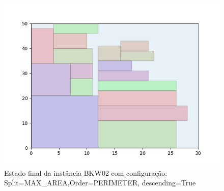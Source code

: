\begin{figure}[H]
    \centering
    \caption[]{Estado final da instância BKW02 com configuração: Split=MAX_AREA,Order=PERIMETER, descending=True}
    \label{fig:bkw02-max_area-perimeter-true}
    \includegraphics[scale=0.5]{output/figures/bkw/bkw02/max_area/perimeter/true/00}
\end{figure}